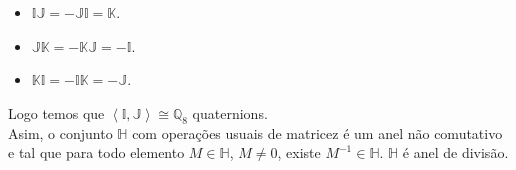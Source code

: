 \begin{example}
\begin{itemize}
\begin{itemize}
        \item $\mathbb{I}\mathbb{J}=-\mathbb{J}\mathbb{I}=\mathbb{K}$.
        \item $\mathbb{J}\mathbb{K}=-\mathbb{K}\mathbb{J}=-\mathbb{I}$.
        \item $\mathbb{K}\mathbb{I}=-\mathbb{I}\mathbb{K}=-\mathbb{J}$.
      \end{itemize}
      Logo temos que $\left\langle \mathbb{I},\mathbb{J} \right\rangle\cong \mathbb{Q}_{8}$ quaternions.\\
      Asim, o conjunto $\mathbb{H}$ com operações usuais de matricez é um anel não comutativo e tal que para todo elemento $M\in \mathbb{H}$, $M\neq 0$, existe $M^{-1}\in\mathbb{H}$. $\mathbb{H}$ é anel de divisão. 
  \end{itemize}
\end{example}
